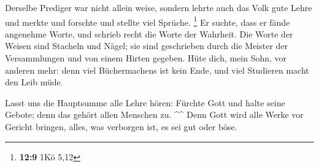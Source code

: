  Derselbe Prediger war nicht allein weise, sondern lehrte
auch das Volk gute Lehre und merkte und forschte und stellte viel
Sprüche. \footnote{\textbf{12:9} 1Kö 5,12}  Er suchte, dass
er fände angenehme Worte, und schrieb recht die Worte der Wahrheit.
 Die Worte der Weisen sind Stacheln und Nägel; sie sind
geschrieben durch die Meister der Versammlungen und von einem Hirten
gegeben.  Hüte dich, mein Sohn, vor anderen mehr: denn viel
Büchermachens ist kein Ende, und viel Studieren macht den Leib müde.

 Lasst uns die Hauptsumme alle Lehre hören: Fürchte Gott
und halte seine Gebote; denn das gehört allen Menschen zu. \^{}\^{}
 Denn Gott wird alle Werke vor Gericht bringen, alles, was
verborgen ist, es sei gut oder böse.
